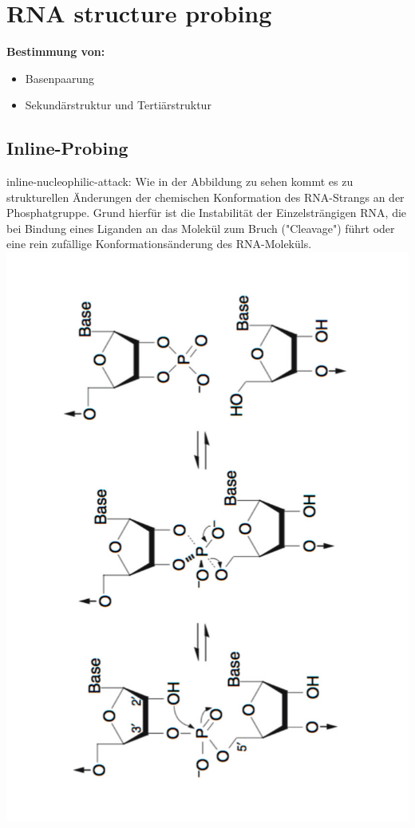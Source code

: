 \section{RNA structure probing}

\textbf{Bestimmung von:}
\begin{itemize}
\item Basenpaarung
\item Sekundärstruktur und Tertiärstruktur
\end{itemize}

\subsection{Inline-Probing}
inline-nucleophilic-attack: Wie in der Abbildung zu sehen kommt es zu strukturellen Änderungen der chemischen Konformation des RNA-Strangs an der Phosphatgruppe. Grund hierfür ist die Instabilität der Einzelsträngigen RNA, die bei Bindung eines Liganden an das Molekül zum Bruch ("Cleavage") führt oder eine rein zufällige Konformationsänderung des RNA-Moleküls. \\
\includegraphics[scale=0.25,angle=270]{lectures/160527/pix/inline.jpg}

